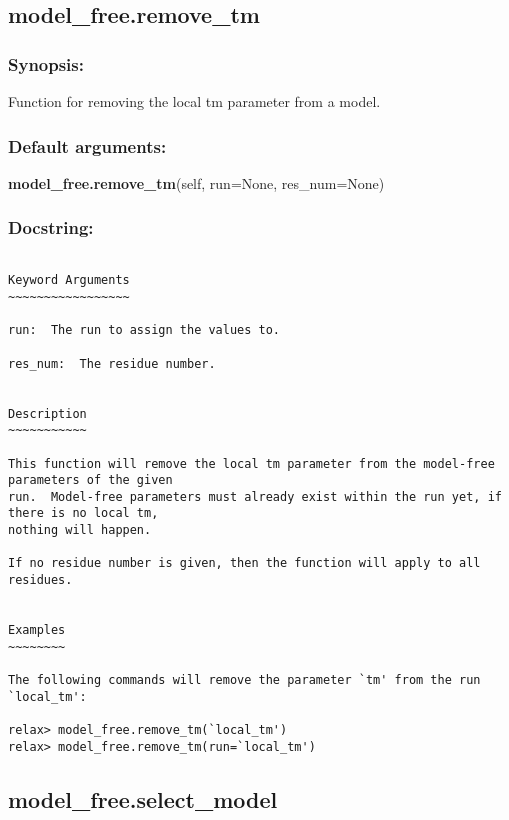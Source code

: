 \newpage

\subsection{model\_free.remove\_tm}


\subsubsection{Synopsis:}

Function for removing the local tm parameter from a model.

\subsubsection{Default arguments:}

\textsf{\textbf{model\_free.remove\_tm}(self, run=None, res\_num=None)
}


\subsubsection{Docstring:}

{\scriptsize
\begin{verbatim}

Keyword Arguments
~~~~~~~~~~~~~~~~~

run:  The run to assign the values to.

res_num:  The residue number.


Description
~~~~~~~~~~~

This function will remove the local tm parameter from the model-free parameters of the given
run.  Model-free parameters must already exist within the run yet, if there is no local tm,
nothing will happen.

If no residue number is given, then the function will apply to all residues.


Examples
~~~~~~~~

The following commands will remove the parameter `tm' from the run `local_tm':

relax> model_free.remove_tm(`local_tm')
relax> model_free.remove_tm(run=`local_tm')
\end{verbatim}
}



\newpage

\subsection{model\_free.select\_model}


